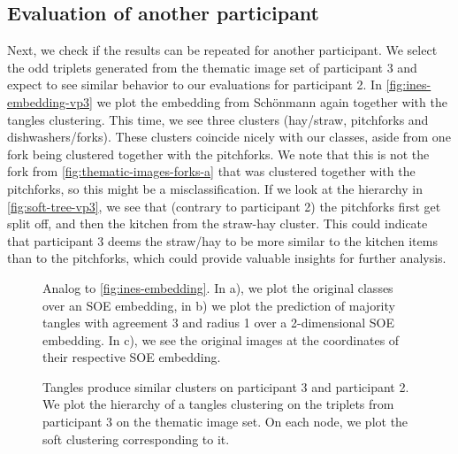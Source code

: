 \subsection{Evaluation of another participant}
Next, we check if the results can be repeated for another participant. 
We select the odd triplets generated from the thematic image set of participant 3 and expect to see similar behavior to our evaluations for participant 2. 
In \autoref{fig:ines-embedding-vp3} we plot the embedding
from Schönmann again together with the tangles clustering. This time, we see three clusters (hay/straw, pitchforks and dishwashers/forks). These clusters coincide nicely
with our classes, aside from one fork being clustered together with the pitchforks. We note that this is not the fork from \autoref{fig:thematic-images-forks-a} that was clustered together 
with the pitchforks, so this might be a misclassification. 
If we look at the hierarchy in \autoref{fig:soft-tree-vp3}, we see that (contrary to participant 2) the pitchforks first get split off, 
and then the kitchen from the straw-hay cluster. This could indicate that participant 3 deems the straw/hay to be more similar to the kitchen items
than to the pitchforks, which could provide valuable insights for further analysis.

\begin{figure}[ht]
    \centering
    \hfill
    \caption{
        Analog to \autoref{fig:ines-embedding}. In a), we plot the original classes over an SOE embedding, in b) we plot the prediction of majority tangles with agreement 3 and radius 1 over 
        a 2-dimensional SOE embedding. In c), we see the original images at the coordinates of their respective SOE embedding.
    }
    \label{fig:ines-embedding-vp3}
\end{figure}

\begin{figure}[ht]
    \centering
    \caption{
        Tangles produce similar clusters on participant 3 and participant 2. We plot the hierarchy of a tangles clustering on the triplets from participant 3 on the thematic image set. 
        On each node, we plot the soft clustering corresponding to it.
    }
    \label{fig:soft-tree-vp3}
\end{figure}
\FloatBarrier
